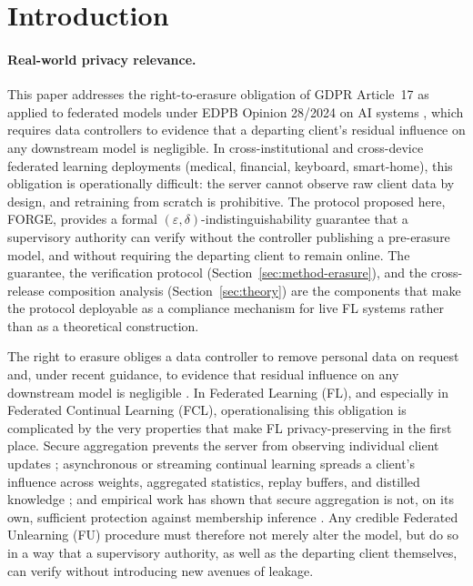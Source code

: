 \section{Introduction}
\label{sec:introduction}

\paragraph{Real-world privacy relevance.}
This paper addresses the right-to-erasure obligation of GDPR Article~17 as applied to
federated models under EDPB Opinion 28/2024 on AI systems \cite{edpb2024}, which
requires data controllers to evidence that a departing client's residual influence on
any downstream model is negligible. In cross-institutional and cross-device federated
learning deployments (medical, financial, keyboard, smart-home), this obligation is
operationally difficult: the server cannot observe raw client data by design, and
retraining from scratch is prohibitive. The protocol proposed here, FORGE, provides
a formal $(\varepsilon, \delta)$-indistinguishability guarantee that a supervisory
authority can verify without the controller publishing a pre-erasure model, and
without requiring the departing client to remain online. The guarantee, the
verification protocol (Section~\ref{sec:method-erasure}), and the cross-release
composition analysis (Section~\ref{sec:theory}) are the components that make the
protocol deployable as a compliance mechanism for live FL systems rather than as a
theoretical construction.

The right to erasure obliges a data controller to remove personal data on request and,
under recent guidance, to evidence that residual influence on any downstream model is
negligible \cite{edpb2024}. In Federated Learning (FL), and especially in Federated
Continual Learning (FCL), operationalising this obligation is complicated by the very
properties that make FL privacy-preserving in the first place. Secure aggregation
prevents the server from observing individual client updates \cite{bonawitz2017};
asynchronous or streaming continual learning spreads a client's influence across weights,
aggregated statistics, replay buffers, and distilled knowledge \cite{yoon2021}; and
empirical work has shown that secure aggregation is not, on its own, sufficient
protection against membership inference \cite{pillutla2023}. Any credible Federated
Unlearning (FU) procedure must therefore not merely alter the model, but do so in a way
that a supervisory authority, as well as the departing client themselves, can verify
without introducing new avenues of leakage.


